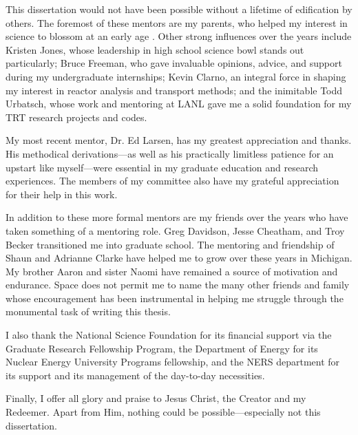 \documentclass[twoside]{umthesis}
\begin{document}
\begin{acknowledgments}
  This dissertation would not have been possible without a lifetime of
  edification by others. The foremost of these mentors are my
  parents, who helped my
  interest in science to blossom at an early age \cite{Lew1989}.
  Other strong influences over the years include Kristen Jones, whose
  leadership in high school science bowl stands out particularly;
  Bruce Freeman, who gave invaluable opinions, advice, and support during my
  undergraduate internships; Kevin Clarno, an
  integral force in shaping my interest in reactor analysis and transport
  methods; and the inimitable Todd Urbatsch, whose work and mentoring at LANL
  gave me a solid foundation for my TRT research projects and codes.

  My most recent mentor, Dr. Ed Larsen, has my greatest appreciation and thanks.
  His methodical derivations---as well as his practically limitless patience for
  an upstart like myself---were essential in my graduate education and
  research experiences. The members of my committee also have my grateful
  appreciation for their help in this work.

  In addition to these more formal mentors are my friends over the years who
  have taken something of a mentoring role. Greg Davidson, Jesse Cheatham, and
  Troy Becker transitioned me into graduate school.
  The mentoring and friendship of Shaun and Adrianne Clarke have
  helped me to grow over these years in Michigan. My brother Aaron and sister
  Naomi have remained a source of motivation and endurance.
  Space does not permit me to name the many other friends and family whose
  encouragement
  has been instrumental in helping me struggle through the monumental task of
  writing this thesis.

  I also thank the National Science Foundation for its financial support via
  the Graduate Research Fellowship Program, the Department of Energy for its
  Nuclear Energy University Programs fellowship, and the NERS department for its
  support and its management of the day-to-day necessities.

  Finally, I offer all glory and praise to Jesus Christ, the Creator and my
  Redeemer. Apart from Him, nothing could be possible---especially not this
  dissertation.
\end{acknowledgments}

\end{document}
